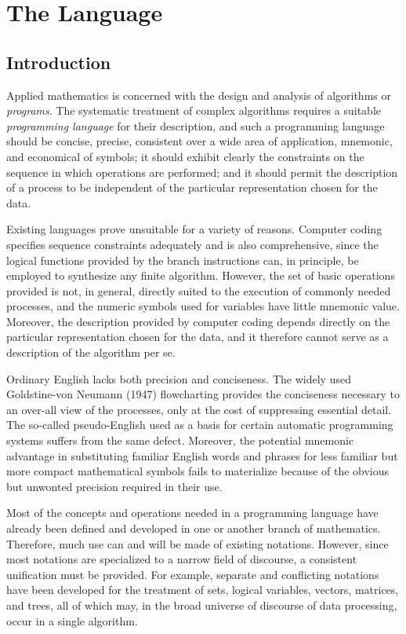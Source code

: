 
\chapter{The Language}

\section{Introduction}

\par Applied mathematics is concerned with the design and analysis of algorithms or \textit{programs}. The systematic treatment of complex algorithms requires a suitable \textit{programming language} for their description, and such a programming language should be concise, precise, consistent over a wide area of application, mnemonic, and economical of symbols; it should exhibit clearly the constraints on the sequence in which operations are performed; and it should permit the description of a process to be independent of the particular representation chosen for the data.

\par Existing languages prove unsuitable for a variety of reasons. Computer coding specifies sequence constraints adequately and is also comprehensive, since the logical functions provided by the branch instructions can, in principle, be employed to synthesize any finite algorithm. However, the set of basic operations provided is not, in general, directly suited to the execution of commonly needed processes, and the numeric symbols used for variables have little mnemonic value. Moreover, the description provided by computer coding depends directly on the particular representation chosen for the data, and it therefore cannot serve as a description of the algorithm per se.

\par Ordinary English lacks both precision and conciseness. The widely used Goldstine-von Neumann (1947) flowcharting provides the conciseness necessary to an over-all view of the processes, only at the cost of suppressing essential detail. The so-called pseudo-English used as a basis for certain automatic programming systems suffers from the same defect. Moreover, the potential mnemonic advantage in substituting familiar English words and phrases for less familiar but more compact mathematical symbols fails to materialize because of the obvious but unwonted precision required in their use.

\par Most of the concepts and operations needed in a programming language have already been defined and developed in one or another branch of mathematics. Therefore, much use can and will be made of existing notations. However, since most notations are specialized to a narrow field of discourse, a consistent unification must be provided. For example, separate and conflicting notations have been developed for the treatment of sets, logical variables, vectors, matrices, and trees, all of which may, in the broad universe of discourse of data processing, occur in a single algorithm.

